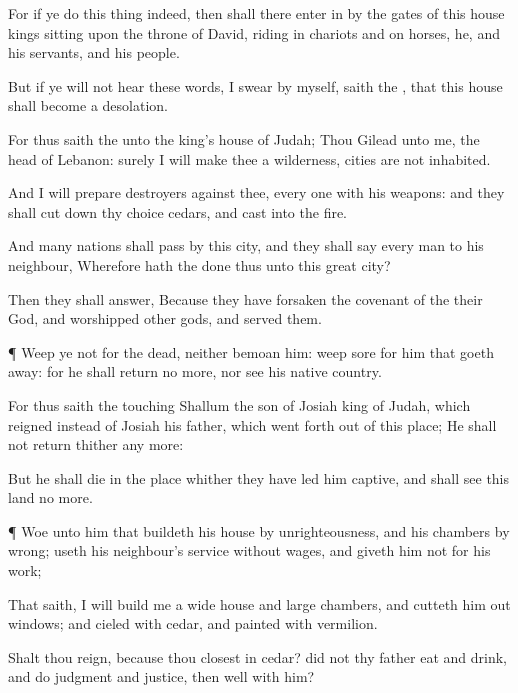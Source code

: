 {For if ye
do this
thing
indeed, then shall there enter
in by the
gates of this
house
kings
sitting upon the
throne of
David,
riding in
chariots and on
horses, he, and his
servants, and his
people.

But if ye will not
hear these
words, I
swear by myself,
saith the
{}, that this
house shall become a
desolation.

For thus
saith the
{} unto the
king’s
house of
Judah; Thou
{}
Gilead unto me,
{} the
head of
Lebanon:
{} surely I will
make thee a
wilderness,
{}
cities
{} are not
inhabited.

And I will
prepare
destroyers against thee, every
one with his
weapons: and they shall cut
down thy
choice
cedars, and
cast
{} into the
fire.

And
many
nations shall
pass by this
city, and they shall
say every
man to his
neighbour, Wherefore hath the
{}
done thus unto this
great
city?

Then they shall
answer, Because they have
forsaken the
covenant of the
{} their
God, and
worshipped
other
gods, and
served them.


\par }{\PP {}¶
Weep ye not for the
dead, neither
bemoan him:
{}
weep
sore for him that goeth
away: for he shall
return no more, nor
see his
native
country.

For thus
saith the
{}
touching
Shallum the
son of
Josiah
king of
Judah, which
reigned instead of
Josiah his
father, which went
forth out of this
place; He shall not
return thither any more:

But he shall
die in the
place whither they have led him
captive, and shall
see this
land no more.


\par }{\PP {}¶
Woe unto him that
buildeth his
house
by
unrighteousness, and his
chambers by
wrong;
{} useth his
neighbour’s
service without
wages, and
giveth him not for his
work;

That
saith, I will
build me a
wide
house and
large
chambers, and cutteth him
out
windows; and
{}
cieled with
cedar, and
painted with
vermilion.

Shalt thou
reign, because thou
closest
{} in
cedar? did not thy
father
eat and
drink, and
do
judgment and
justice,
{} then
{}
well with him?

}
